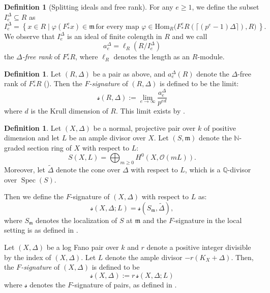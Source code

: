\documentclass[11pt,reqno]{amsart}
\newcommand{\Q}{\mathbb{Q}}
\newcommand{\N}{\mathbb{N}}
\newcommand{\cO}{\mathcal{O}}
\newcommand{\fm}{\mathfrak{m}}
\DeclareMathOperator{\Spec}{Spec}
\newcommand{\Hom}{\mathrm{Hom}}
\newcommand{\Fe}{F_* ^e}
\numberwithin{equation}{section}
\theoremstyle{definition}
\newtheorem{defi}[prop] {Definition}
\newcommand{\s}{\mathscr{s}}
\begin{document}
 	\begin{defi}[Splitting ideals and free rank] \label{frrkkdfn}
 	For any $e \geq 1$, we define the subset $I_e ^{\Delta} \subseteq R$ as 
 	\[I_e ^{\Delta} = \left\{x\in R \mid \varphi(\Fe x) \in \fm \,\text{for every map } \varphi \in \Hom_R \big( \Fe R(\lceil (p^e -1) \Delta \rceil), R \big) \, \right \}.\]
 		We observe that $I_e ^{\Delta}$ is an ideal of finite colength in $R$
 	and we call 
 	 $$ a_e ^{\Delta} = \ell_{R}(R/I_{e} ^{\Delta}) $$
 	the \emph{$\Delta$-free rank} of $\Fe R$, where $\ell_R$ denotes the length as an $R$-module.
 	\end{defi}
	
	
	\begin{defi} \cite[Theorem 3.11, Proposition 3.5]{BlickleSchwedeTuckerFSigPairs1} \label{F-sigdfn}
 		Let $(R, \Delta)$ be a pair as above, and $a_e ^{\Delta} (R)$ denote the $\Delta$-free rank of $\Fe R$ (). Then the \emph{$F$-signature} of $(R, \Delta)$ is defined to be the limit:
 		$$ \s(R, \Delta) := \lim_{e \to \infty} \frac{a_{e} ^{\Delta}}{p^{ed}} $$
 		where $d$ is the Krull dimension of $R$. This limit exists by \cite{BlickleSchwedeTuckerFSigPairs1}.
 	\end{defi}


\begin{defi} \label{Fsigofsectionrings}
    Let $(X, \Delta)$ be a normal, projective pair over $k$ of positive dimension and let $L$ be an ample divisor over $X$. Let $(S, \fm)$ denote the $\N$-graded section ring of $X$ with respect to $L$:
    \[ S(X, L) = \bigoplus _{m \geq 0} H^0 (X, \cO (mL)). \]
    Moreover, let $\tilde{\Delta}$ denote the cone over $\Delta$ with respect to $L$, which is a $\Q$-divisor over $\Spec(S)$.
    
   Then we define the $F$-signature of $(X, \Delta)$ with respect to $L$ as:
  \[ \s(X, \Delta;L) = \s(S_\fm, \tilde{\Delta}),\]
   where $S_\fm$ denotes the localization of $S$ at $\fm$ and the $F$-signature in the local setting is as defined in .

   Let $(X, \Delta)$ be a log Fano pair over $k$ and $r$ denote a positive integer divisible by the index of $(X, \Delta)$. Let $L$ denote the ample divisor $-r(K_X + \Delta)$. Then, the \emph{$F$-signature} of $(X, \Delta)$ is defined to be
    $$ \s(X, \Delta) := r \, \s (X, \Delta; L) $$
    where $\s$ denotes the $F$-signature of pairs, as defined in .
\end{defi}
\end{document}
